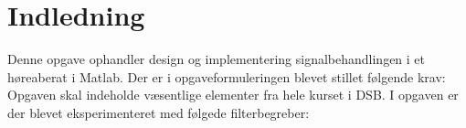 \chapter{Indledning}\label{ch:introduction}
Denne opgave ophandler design og implementering signalbehandlingen i et høreaberat i Matlab. Der er i opgaveformuleringen blevet stillet følgende krav: Opgaven skal indeholde væsentlige elementer fra hele kurset i DSB. I opgaven er der blevet eksperimenteret med følgede filterbegreber:


